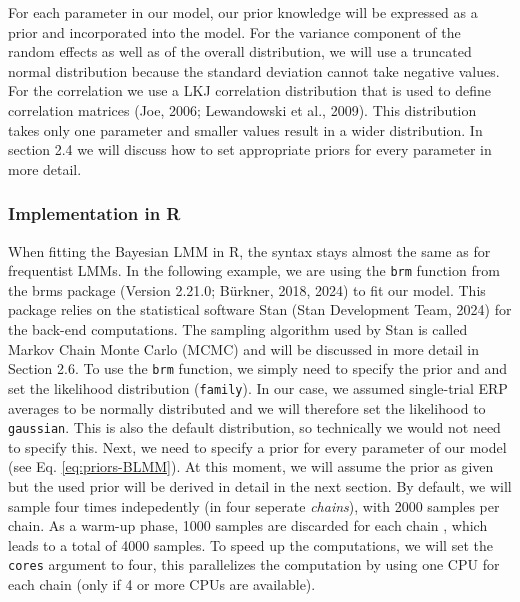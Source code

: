 \documentclass[
  doc,12pt,floatsintext]{apa7}
\begin{document}
For each parameter in our model, our prior knowledge will be expressed as a prior and incorporated into the model. For the variance component of the random effects as well as of the overall distribution, we will use a truncated normal distribution because the standard deviation cannot take negative values. For the correlation we use a LKJ correlation distribution that is used to define correlation matrices (Joe, 2006; Lewandowski et al., 2009). This distribution takes only one parameter and smaller values result in a wider distribution. In section 2.4 we will discuss how to set appropriate priors for every parameter in more detail.

\subsubsection{Implementation in R}\label{implementation-in-r}

When fitting the Bayesian LMM in R, the syntax stays almost the same as for frequentist LMMs. In the following example, we are using the \texttt{brm} function from the brms package (Version 2.21.0; Bürkner, 2018, 2024) to fit our model. This package relies on the statistical software Stan (Stan Development Team, 2024) for the back-end computations. The sampling algorithm used by Stan is called Markov Chain Monte Carlo (MCMC) and will be discussed in more detail in Section 2.6. To use the \texttt{brm} function, we simply need to specify the prior and and set the likelihood distribution (\texttt{family}). In our case, we assumed single-trial ERP averages to be normally distributed and we will therefore set the likelihood to \texttt{gaussian}. This is also the default distribution, so technically we would not need to specify this. Next, we need to specify a prior for every parameter of our model (see Eq. \eqref{eq:priors-BLMM}). At this moment, we will assume the prior as given but the used prior will be derived in detail in the next section. By default, we will sample four times indepedently (in four seperate \emph{chains}), with 2000 samples per chain. As a warm-up phase, 1000 samples are discarded for each chain , which leads to a total of 4000 samples. To speed up the computations, we will set the \texttt{cores} argument to four, this parallelizes the computation by using one CPU for each chain (only if 4 or more CPUs are available).
\end{document}
